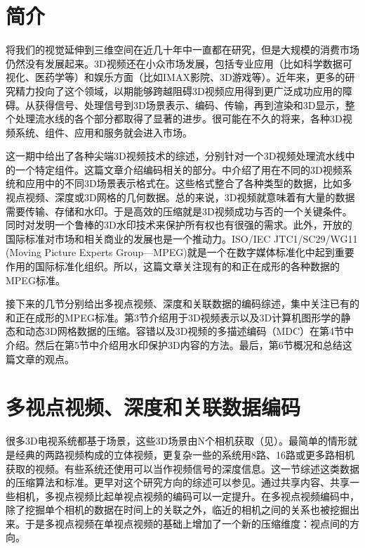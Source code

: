 \section{简介}

将我们的视觉延伸到三维空间在近几十年中一直都在研究，但是大规模的消费市场仍然没有发展起来。3D视频还在小众市场发展，包括专业应用（比如科学数据可视化、医药学等）和娱乐方面（比如IMAX影院、3D游戏等）。近年来，更多的研究精力投向了这个领域，以期能够跨越阻碍3D视频应用得到更广泛成功应用的障碍\cite{smolic20063d, onural2004overview, smolic20043dav, smolic2005interactive, onural2006assessment}。从获得信号、处理信号到3D场景表示、编码、传输，再到渲染和3D显示，整个处理流水线的各个部分都取得了显著的进步。很可能在不久的将来，各种3D视频系统、组件、应用和服务就会进入市场。

这一期中给出了各种尖端3D视频技术的综述，分别针对一个3D视频处理流水线中的一个特定组件。这篇文章介绍编码相关的部分。中介绍了用在不同的3D视频系统和应用中的不同3D场景表示格式在。这些格式整合了各种类型的数据，比如多视点视频、深度或3D网格的几何数据。总的来说，3D视频就意味着有大量的数据需要传输、存储和水印。于是高效的压缩就是3D视频成功与否的一个关键条件。同时对发明一个鲁棒的3D水印技术来保护所有权也有很强的需求。此外，开放的国际标准对市场和相关商业的发展也是一个推动力。ISO/IEC JTC1/SC29/WG11 (Moving Picture Experts Group—MPEG)就是一个在数字媒体标准化中起到重要作用的国际标准化组织。所以，这篇文章关注现有的和正在成形的各种数据的MPEG标准。

接下来的几节分别给出多视点视频、深度和关联数据的编码综述，集中关注已有的和正在成形的MPEG标准。第3节介绍用于3D视频表示以及3D计算机图形学的静态和动态3D网格数据的压缩。容错以及3D视频的多描述编码（MDC）在第4节中介绍。然后在第5节中介绍用水印保护3D内容的方法。最后，第6节概况和总结这篇文章的观点。

\section{多视点视频、深度和关联数据编码}

很多3D电视系统都基于场景，这些3D场景由N个相机获取（见）。最简单的情形就是经典的两路视频构成的立体视频，更复杂一些的系统用8路、16路或更多路相机获取的视频。有些系统还使用可以当作视频信号的深度信息。这一节综述这类数据的压缩算法和标准。更早对这个研究方向的综述可以参见。通过共享内容、共享一些相机，多视点视频比起单视点视频的编码可以一定提升。在多视点视频编码中，除了挖掘单个相机的数据在时间上的关联之外，临近的相机之间的关系也被挖掘出来。于是多视点视频在单视点视频的基础上增加了一个新的压缩维度：视点间的方向。

